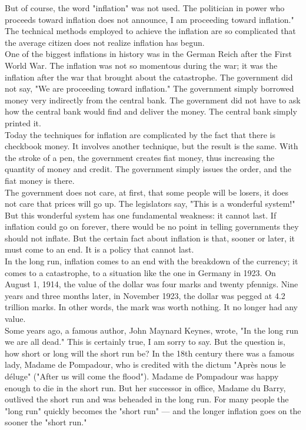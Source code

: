 \documentclass[a4paper]{article}
\begin{document}
But of course, the word "inflation" was not used. The politician in power who 
proceeds toward inflation does not announce, I am proceeding toward inflation."
The technical methods employed to achieve the inflation are so complicated that
the average citizen does not realize inflation has begun.\\

One of the biggest inflations in history was in the German Reich after the 
First World War. The inflation was not so momentous during the war; it was the 
inflation after the war that brought about the catastrophe. The government did 
not say, "We are proceeding toward inflation." The government simply borrowed 
money very indirectly from the central bank. The government did not have to ask
how the central bank would find and deliver the money. The central bank simply 
printed it.\\

Today the techniques for inflation are complicated by the fact that there is 
checkbook money. It involves another technique, but the result is the same. 
With the stroke of a pen, the government creates fiat money, thus increasing 
the quantity of money and credit. The government simply issues the order, and 
the fiat money is there.\\

The government does not care, at first, that some people will be losers, it 
does not care that prices will go up. The legislators say, "This is a wonderful
system!" But this wonderful system has one fundamental weakness: it cannot 
last. If inflation could go on forever, there would be no point in telling 
governments they should not inflate. But the certain fact about inflation is 
that, sooner or later, it must come to an end. It is a policy that cannot last.\\

In the long run, inflation comes to an end with the breakdown of the currency; 
it comes to a catastrophe, to a situation like the one in Germany in 1923. On 
August 1, 1914, the value of the dollar was four marks and twenty pfennigs. 
Nine years and three months later, in November 1923, the dollar was pegged at 
4.2 trillion marks. In other words, the mark was worth nothing. It no longer 
had any value.\\

Some years ago, a famous author, John Maynard Keynes, wrote, "In the long run 
we are all dead." This is certainly true, I am sorry to say. But the question 
is, how short or long will the short run be? In the 18th century there was a 
famous lady, Madame de Pompadour, who is credited with the dictum "Après nous 
le déluge" ("After us will come the flood"). Madame de Pompadour was happy 
enough to die in the short run. But her successor in office, Madame du Barry, 
outlived the short run and was beheaded in the long run. For many people the 
"long run" quickly becomes the "short run" — and the longer inflation goes on 
the sooner the "short run."\\
\end{document}
